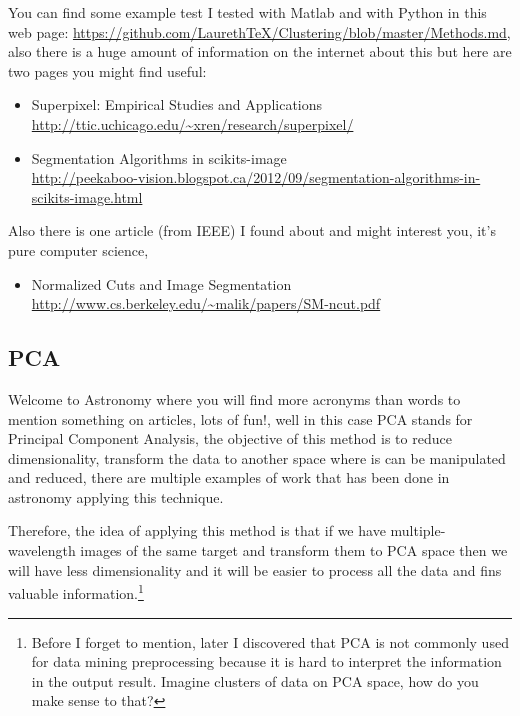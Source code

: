 \documentclass[11pt,fleqn]{book} %
\begin{document}
\begin{remark}
	You can find some example test I tested with Matlab and with Python in this web page: \url{https://github.com/LaurethTeX/Clustering/blob/master/Methods.md}, also there is a huge amount of information on the internet about this but here are two pages you might find useful:
    \begin{itemize}
    	\item Superpixel: Empirical Studies and Applications \\ \url{http://ttic.uchicago.edu/~xren/research/superpixel/}
        \item Segmentation Algorithms in scikits-image \\ \url{http://peekaboo-vision.blogspot.ca/2012/09/segmentation-algorithms-in-scikits-image.html}
    \end{itemize}
    Also there is one article (from IEEE) I found about and might interest you, it's pure computer science,
    \begin{itemize}
    	\item Normalized Cuts and Image Segmentation \\ \url{http://www.cs.berkeley.edu/~malik/papers/SM-ncut.pdf}
    \end{itemize}
\end{remark}

\subsection{PCA}

Welcome to Astronomy where you will find more acronyms than words to mention something on articles, lots of fun!, well in this case PCA stands for Principal Component Analysis, the objective of this method is to reduce dimensionality, transform the data to another space where is can be manipulated and reduced, there are multiple examples of work that has been done in astronomy applying this technique.

Therefore, the idea of applying this method is that if we have multiple-wavelength images of the same target and transform them to PCA space then we will have less dimensionality and it will be easier to process all the data and fins valuable information.\footnote{Before I forget to mention, later I discovered that PCA is not commonly used for data mining preprocessing because it is hard to interpret the information in the output result. Imagine clusters of data on PCA space, how do you make sense to that?}
\end{document}
